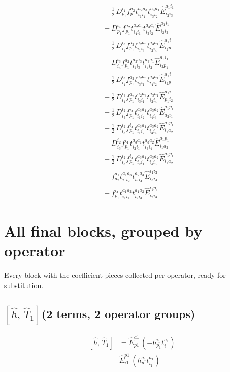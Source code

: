 \documentclass[11pt]{article}
\begin{document}
\begin{align}
&\quad - \tfrac{1}{2}\, D^{i_{4}}_{p_{1}} f^{a_{2}}_{p_{1}} t^{a_{2}a_{3}}_{i_{1}i_{4}} t^{a_{3}a_{1}}_{i_{3}i_{2}} \hat{E}^{a_{1}i_{1}}_{i_{2}i_{3}} \\
&\quad + D^{i_{4}}_{p_{1}} f^{a_{2}}_{p_{1}} t^{a_{2}a_{3}}_{i_{4}i_{1}} t^{a_{3}a_{1}}_{i_{3}i_{2}} \hat{E}^{a_{1}i_{1}}_{i_{2}i_{3}} \\
&\quad - \tfrac{1}{2}\, D^{i_{3}}_{i_{4}} f^{a_{2}}_{p_{1}} t^{a_{2}a_{3}}_{i_{1}i_{3}} t^{a_{3}a_{1}}_{i_{2}i_{4}} \hat{E}^{a_{1}i_{1}}_{i_{2}p_{1}} \\
&\quad + D^{i_{3}}_{i_{4}} f^{a_{2}}_{p_{1}} t^{a_{2}a_{3}}_{i_{1}i_{3}} t^{a_{3}a_{1}}_{i_{4}i_{2}} \hat{E}^{a_{1}i_{1}}_{i_{2}p_{1}} \\
&\quad - \tfrac{1}{2}\, D^{i_{3}}_{i_{4}} f^{a_{2}}_{p_{1}} t^{a_{2}a_{3}}_{i_{3}i_{1}} t^{a_{3}a_{1}}_{i_{4}i_{2}} \hat{E}^{a_{1}i_{1}}_{i_{2}p_{1}} \\
&\quad - \tfrac{1}{2}\, D^{i_{3}}_{i_{4}} f^{a_{2}}_{p_{1}} t^{a_{2}a_{3}}_{i_{3}i_{1}} t^{a_{3}a_{1}}_{i_{2}i_{4}} \hat{E}^{a_{1}i_{1}}_{p_{1}i_{2}} \\
&\quad + \tfrac{1}{2}\, D^{i_{2}}_{i_{3}} f^{i_{4}}_{p_{1}} t^{a_{3}a_{1}}_{i_{1}i_{2}} t^{a_{3}a_{2}}_{i_{4}i_{3}} \hat{E}^{a_{1}p_{1}}_{a_{2}i_{1}} \\
&\quad + \tfrac{1}{2}\, D^{i_{2}}_{i_{3}} f^{i_{4}}_{p_{1}} t^{a_{3}a_{1}}_{i_{1}i_{2}} t^{a_{3}a_{2}}_{i_{3}i_{4}} \hat{E}^{a_{1}p_{1}}_{i_{1}a_{2}} \\
&\quad - D^{i_{2}}_{i_{3}} f^{i_{4}}_{p_{1}} t^{a_{3}a_{1}}_{i_{2}i_{1}} t^{a_{3}a_{2}}_{i_{3}i_{4}} \hat{E}^{a_{1}p_{1}}_{i_{1}a_{2}} \\
&\quad + \tfrac{1}{2}\, D^{i_{2}}_{i_{3}} f^{i_{4}}_{p_{1}} t^{a_{3}a_{1}}_{i_{2}i_{1}} t^{a_{3}a_{2}}_{i_{4}i_{3}} \hat{E}^{a_{1}p_{1}}_{i_{1}a_{2}} \\
&\quad + f^{a_{1}}_{a_{2}} t^{a_{1}a_{3}}_{i_{1}i_{2}} t^{a_{2}a_{3}}_{i_{3}i_{4}} \hat{E}^{i_{1}i_{2}}_{i_{3}i_{4}} \\
&\quad - f^{i_{4}}_{p_{1}} t^{a_{1}a_{2}}_{i_{1}i_{4}} t^{a_{1}a_{2}}_{i_{2}i_{3}} \hat{E}^{i_{1}p_{1}}_{i_{2}i_{3}}
\end{align}
\section{All final blocks, grouped by operator}
Every block with the coefficient pieces collected per operator, ready for substitution.
\subsection*{$\left[\hat{h},\, \hat{T}_{1}\right]$\quad(2 terms, 2 operator groups)}
\begin{align}
\left[\hat{h},\, \hat{T}_{1}\right] &= \hat{E}^{a1}_{p1}\,\left(- h^{i_{1}}_{p_{1}} t^{a_{1}}_{i_{1}} \right) \\
&\hat{E}^{p1}_{i1}\,\left(h^{a_{1}}_{p_{1}} t^{a_{1}}_{i_{1}} \right)
\end{align}
\end{document}
